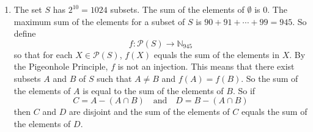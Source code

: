 \documentclass[11pt]{article}
\begin{document}
\begin{enumerate}
\item The set $S$ has $2^{10} = 1024$ subsets.  The sum of the elements of $\emptyset$ is 0.  The maximum sum of the elements for a subset of $S$ is $90 + 91 + \cdots + 99 = 945$.  So define
\[
f: \mathcal{P} \left( S \right) \to \mathbb{N}_{945}
\]
so that for each $X \in \mathcal{P} \left( S \right)$, $f \left( X \right) $ equals the sum of the elements in $X$.  By the Pigeonhole Principle, $f$ is not an injection.  This means that there exist subsets $A$ and $B$ of $S$ such that $A \ne B$ and 
$f \left( A \right) = f \left( B \right)$.  So the sum of the elements of $A$ is equal to the sum of the elements of $B$.  So if
\[
C = A - \left( A \cap B \right) \quad \text{and} \quad D = B - \left( A \cap B \right)
\]
then $C$ and $D$ are disjoint and the sum of the elements of $C$ equals the sum of the elements of $D$.

\end{enumerate}
\end{document}

